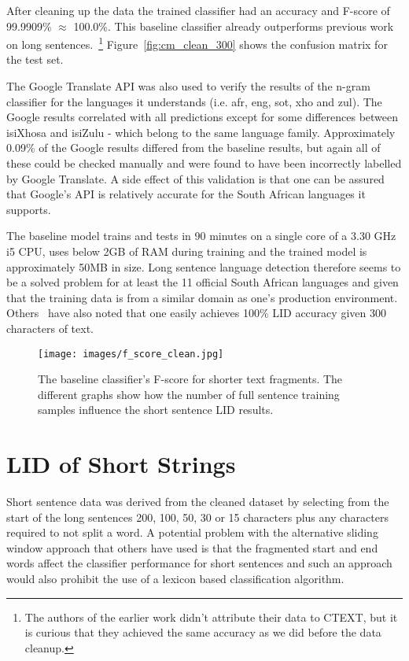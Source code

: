 \documentclass[conference]{IEEEtran}
\begin{document}
After cleaning up the data the trained classifier had an accuracy and F-score of 99.9909\% $\approx$ 100.0\%. This baseline classifier already outperforms previous work~\cite{BothaBarnard2012} on long sentences.~\footnote{The authors of the earlier work didn't attribute their data to CTEXT, but it is curious that they achieved the same accuracy as we did before the data cleanup.} Figure~\ref{fig:cm_clean_300} shows the confusion matrix for the test set.

The Google Translate API was also used to verify the results of the n-gram classifier for the languages it understands (i.e. afr, eng, sot, xho and zul). The Google results correlated with all predictions except for some differences between isiXhosa and isiZulu - which belong to the same language family. Approximately 0.09\% of the Google results differed from the baseline results, but again all of these could be checked manually and were found to have been incorrectly labelled by Google Translate. A side effect of this validation is that one can be assured that Google's API is relatively accurate for the South African languages it supports.

The baseline model trains and tests in 90 minutes on a single core of a 3.30 GHz i5 CPU, uses below 2GB of RAM during training and the trained model is approximately 50MB in size. Long sentence language detection therefore seems to be a solved problem for at least the 11 official South African languages and given that the training data is from a similar domain as one's production environment. Others~\cite{GiwaDavel2013} have also noted that one easily achieves 100\% LID accuracy given 300 characters of text.


\begin{figure}[!t]
\centering
\texttt{[image: images/f\_score\_clean.jpg]}
\caption{The baseline classifier's F-score for shorter text fragments. The different graphs show how the number of full sentence training samples influence the short sentence LID results.}
\label{fig:f_score_clean}
\end{figure}

\section{LID of Short Strings}
\label{sec:core}
Short sentence data was derived from the cleaned dataset by selecting from the start of the long sentences 200, 100, 50, 30 or 15 characters plus any characters required to not split a word. A potential problem with the alternative sliding window approach that others have used is that the fragmented start and end words affect the classifier performance for short sentences and such an approach would also prohibit the use of a lexicon based classification algorithm.
\end{document}
